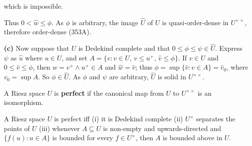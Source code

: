 {\noindent which is impossible.\ \Bang

Thus $0<\hat w\le\phi$.  As $\phi$ is arbitrary, the image $\hat U$ of
$U$ is quasi-order-dense in $U^{\times\times}$, therefore order-dense
(353A).

\medskip

{\bf (c)} Now suppose that $U$ is Dedekind complete and that
$0\le\phi\le\psi\in\hat U$.   Express $\psi$ as $\hat u$ where $u\in U$,
and set $A=\{v:v\in U,\,v\le u^+,\,\hat v\le\phi\}$.   If $v\in U$ and
$0\le\hat v\le\phi$, then $w=v^+\wedge u^+\in A$ and $\hat w=\hat v$;
thus $\phi=\sup\{\hat v:v\in A\}=\hat v_0$, where $v_0=\sup A$.   So
$\phi\in\hat U$.   As $\phi$ and $\psi$ are arbitrary, $\hat U$ is solid
in $U^{\times\times}$.
}%

 A Riesz space $U$ is {\bf perfect} if the
canonical map from $U$ to $U^{\times\times}$ is an isomorphism.

 A Riesz space $U$ is perfect iff (i) it is
Dedekind complete (ii) $U^{\times}$ separates the points of $U$ (iii)
whenever $A\subseteq U$ is non-empty and upwards-directed and
$\{f(u):u\in A\}$ is bounded for every $f\in U^{\times}$, then $A$ is
bounded above in $U$.

